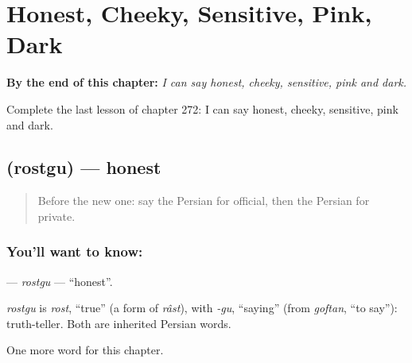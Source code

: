 
\chapter{Honest, Cheeky, Sensitive, Pink, Dark}
\label{ch:fa-honest-cheeky-sensitive-pink-dark}

\begin{chapteropening}
\textbf{By the end of this chapter:} \emph{I can say honest, cheeky, sensitive, pink and dark.}

Complete the last lesson of chapter 272: I can say honest, cheeky, sensitive, pink and dark.
\end{chapteropening}

\section[\texorpdfstring{\fa{راستگو} (rostgu)}{راستگو (rostgu)}]{ (rostgu) — honest}

\label{lesson:FA-C272-rostgu}



\begin{quote}
Before the new one: say the Persian for official, then the Persian for private.
\end{quote}

\subsection*{You'll want to know: }
\textbf{} — \emph{rostgu} — \textquotedblleft{}honest\textquotedblright{}.

\begin{cousinweb}
\emph{rostgu} is \emph{rost}, \textquotedblleft{}true\textquotedblright{} (a form of \emph{râst}), with \emph{-gu}, \textquotedblleft{}saying\textquotedblright{} (from \emph{goftan}, \textquotedblleft{}to say\textquotedblright{}): truth-teller. Both are inherited Persian words.
\end{cousinweb}

\begin{grammarlens}[title={What you've built}]
One more word for this chapter.
\end{grammarlens}

